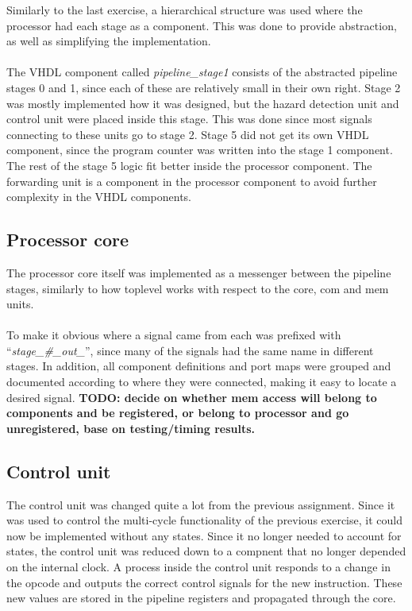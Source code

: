 Similarly to the last exercise, a hierarchical structure was used where the
processor had each stage as a component. This was done to provide abstraction,
as well as simplifying the implementation.
\paragraph*{}
The VHDL component called \emph{pipeline\_stage1} consists of the abstracted
pipeline stages 0 and 1, since each of these are relatively small in their own
right. Stage 2 was mostly implemented how it was designed, but the hazard
detection unit and control unit were placed inside this stage. This was done
since most signals connecting to these units go to stage 2. Stage 5 did not get
its own VHDL component, since the program counter was written into the stage 1
component. The rest of the stage 5 logic fit better inside the processor
component. The forwarding unit is a component in the processor component to
avoid further complexity in the VHDL components.

\subsection{Processor core}
The processor core itself was implemented as a messenger between the pipeline
stages, similarly to how toplevel works with respect to the core, com and mem
units.
\paragraph*{}
To make it obvious where a signal came from each was prefixed with
``\emph{stage\_\#\_out\_}'', since many of the signals had the same name in
different stages. In addition, all component definitions and port maps were
grouped and documented according to where they were connected, making it easy to
locate a desired signal.\newline
\textbf{TODO: decide on whether mem access will belong to components and be registered, or belong to processor and go unregistered, base on testing/timing results.}

\subsection{Control unit}
The control unit was changed quite a lot from the previous assignment. Since it was used to control the multi-cycle functionality of the previous exercise, it could now be implemented without any states. Since it no longer needed to account for states, the control unit was reduced down to a compnent that no longer depended on the internal clock. A process inside the control unit responds to a change in the opcode and outputs the correct control signals for the new instruction. These new values are stored in the pipeline registers and propagated through the core. 
